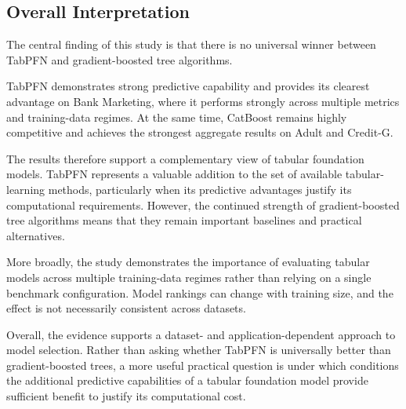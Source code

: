 \subsection{Overall Interpretation}\label{overall-interpretation}

The central finding of this study is that there is no universal winner between TabPFN and gradient-boosted tree algorithms.

TabPFN demonstrates strong predictive capability and provides its clearest advantage on Bank Marketing, where it performs strongly across multiple metrics and training-data regimes. At the same time, CatBoost remains highly competitive and achieves the strongest aggregate results on Adult and Credit-G.

The results therefore support a complementary view of tabular foundation models. TabPFN represents a valuable addition to the set of available tabular-learning methods, particularly when its predictive advantages justify its computational requirements. However, the continued strength of gradient-boosted tree algorithms means that they remain important baselines and practical alternatives.

More broadly, the study demonstrates the importance of evaluating tabular models across multiple training-data regimes rather than relying on a single benchmark configuration. Model rankings can change with training size, and the effect is not necessarily consistent across datasets.

Overall, the evidence supports a dataset- and application-dependent approach to model selection. Rather than asking whether TabPFN is universally better than gradient-boosted trees, a more useful practical question is under which conditions the additional predictive capabilities of a tabular foundation model provide sufficient benefit to justify its computational cost.
